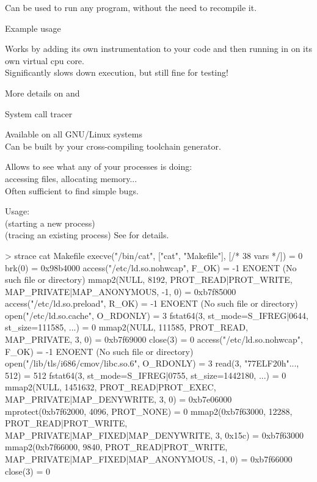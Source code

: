     \startitemize
    \item Can be used to run any program, without the need to
      recompile it.
    \item Example usage\\
    \item Works by adding its own instrumentation to your code and
      then running in on its own virtual cpu core.\\
      Significantly slows down execution, but still fine for testing!
    \item More details on  and
    \stopitemize

  System call tracer\\
  \startitemize
  \item Available on all GNU/Linux systems\\
    Can be built by your cross-compiling toolchain generator.
  \item Allows to see what any of your processes is doing:\\
    accessing files, allocating memory...\\
    Often sufficient to find simple bugs.
  \item Usage:\\
     (starting a new process)\\
     (tracing an existing process)
  \stopitemize
  See  for details.

\starttyping
> strace cat Makefile
execve("/bin/cat", ["cat", "Makefile"], [/* 38 vars */]) = 0
brk(0) = 0x98b4000
access("/etc/ld.so.nohwcap", F_OK) = -1 ENOENT (No such file or directory)
mmap2(NULL, 8192, PROT_READ|PROT_WRITE, MAP_PRIVATE|MAP_ANONYMOUS, -1, 0) = 0xb7f85000
access("/etc/ld.so.preload", R_OK) = -1 ENOENT (No such file or directory)
open("/etc/ld.so.cache", O_RDONLY) = 3
fstat64(3, {st_mode=S_IFREG|0644, st_size=111585, ...}) = 0
mmap2(NULL, 111585, PROT_READ, MAP_PRIVATE, 3, 0) = 0xb7f69000
close(3) = 0
access("/etc/ld.so.nohwcap", F_OK) = -1 ENOENT (No such file or directory)
open("/lib/tls/i686/cmov/libc.so.6", O_RDONLY) = 3
read(3, "\177ELF\1\1\1\0\0\0\0\0\0\0\0\0\3\0\3\0\1\0\0\0\320h\1\0\0\0"..., 512) = 512
fstat64(3, {st_mode=S_IFREG|0755, st_size=1442180, ...}) = 0
mmap2(NULL, 1451632, PROT_READ|PROT_EXEC, MAP_PRIVATE|MAP_DENYWRITE, 3, 0) = 0xb7e06000
mprotect(0xb7f62000, 4096, PROT_NONE) = 0
mmap2(0xb7f63000, 12288, PROT_READ|PROT_WRITE,
      MAP_PRIVATE|MAP_FIXED|MAP_DENYWRITE, 3, 0x15c) = 0xb7f63000
mmap2(0xb7f66000, 9840, PROT_READ|PROT_WRITE,
      MAP_PRIVATE|MAP_FIXED|MAP_ANONYMOUS, -1, 0) = 0xb7f66000
close(3) = 0
\stoptyping

